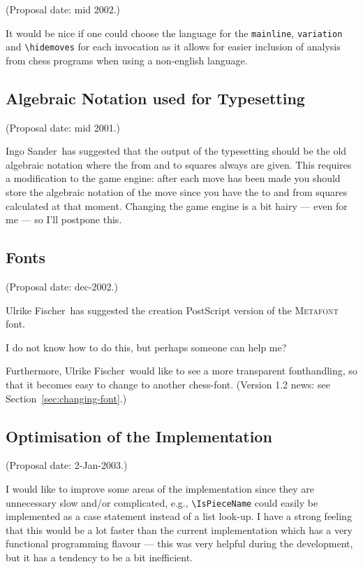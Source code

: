 \documentclass[11pt,twocolumn]{article}
\newcommand{\metafont}{\textsc{Metafont}\ }
\newcommand{\Ingo}{Ingo Sander\ }
\newcommand{\Ulrike}{Ulrike Fischer\ }
\begin{document}
(Proposal date: mid 2002.)

It would be nice if one could choose the language for the
\verb|mainline|, \verb|variation| and \verb|\hidemoves| for each invocation
as it allows for easier inclusion of analysis from chess programs when
using a non-english language.


\subsection{Algebraic Notation used for Typesetting}
\label{sec:algebraic-notation-in-typesetting}

(Proposal date: mid 2001.)

\Ingo has suggested that the output of the typesetting should be the
old algebraic notation where the from and to squares always are
given. This requires a modification to the game engine: after each
move has been made you should store the algebraic notation of the move
since you have the to and from squares calculated at that
moment. Changing the game engine is a bit hairy --- even for me --- so I'll
postpone this.


\subsection{Fonts}
\label{sec:ps-font}

(Proposal date: dec-2002.)

\Ulrike has suggested the creation PostScript version of the \metafont
font.

I do not know how to do this, but perhaps someone can help me?

Furthermore, \Ulrike would like to see a more transparent
fonthandling, so that it becomes easy to change to another chess-font.
(Version 1.2 news: see Section~\ref{sec:changing-font}.)


\subsection{Optimisation of the Implementation}
\label{sec:optim-impl}

(Proposal date: 2-Jan-2003.)

I would like to improve some areas of the implementation since they
are unnecessary slow and/or complicated, e.g., \verb|\IsPieceName|
could easily be implemented as a case statement instead of a list
look-up. I have a strong feeling that this would be a lot faster than
the current implementation which has a very functional programming
flavour --- this was very helpful during the development, but it has a
tendency to be a bit inefficient. 
\end{document}
